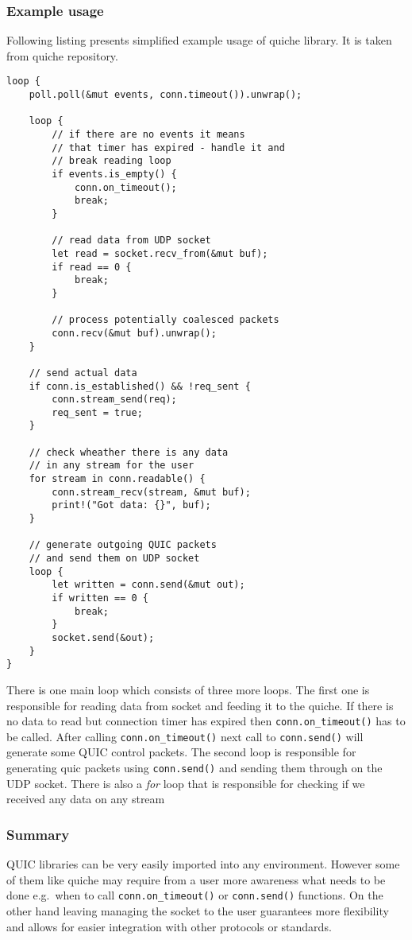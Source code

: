 \FloatBarrier

\subsubsection{Example usage}
Following listing presents simplified example usage of quiche library.
It is taken from quiche repository.
\begin{lstlisting}[label={lst:lstlisting2},caption={Simplified example usage of quiche library.},captionpos=b]
loop {
    poll.poll(&mut events, conn.timeout()).unwrap();

    loop {
        // if there are no events it means
        // that timer has expired - handle it and
        // break reading loop
        if events.is_empty() {
            conn.on_timeout();
            break;
        }

        // read data from UDP socket
        let read = socket.recv_from(&mut buf);
        if read == 0 {
            break;
        }

        // process potentially coalesced packets
        conn.recv(&mut buf).unwrap();
    }

    // send actual data
    if conn.is_established() && !req_sent {
        conn.stream_send(req);
        req_sent = true;
    }

    // check wheather there is any data
    // in any stream for the user
    for stream in conn.readable() {
        conn.stream_recv(stream, &mut buf);
        print!("Got data: {}", buf);
    }

    // generate outgoing QUIC packets
    // and send them on UDP socket
    loop {
        let written = conn.send(&mut out);
        if written == 0 {
            break;
        }
        socket.send(&out);
    }
}
\end{lstlisting}

There is one main loop which consists of three more loops.
The first one is responsible for reading data from socket and feeding it to the quiche.
If there is no data to read but connection timer has expired then \lstinline{conn.on_timeout()} has to be called.
After calling \lstinline{conn.on_timeout()} next call to \lstinline{conn.send()} will generate some QUIC control packets.
The second loop is responsible for generating quic packets using \lstinline{conn.send()} and sending them through on
the UDP socket.
There is also a \textit{for} loop that is responsible for checking if we received any data on any stream

\subsubsection{Summary}
QUIC libraries can be very easily imported into any environment.
However some of them like quiche may require from a user more awareness what needs to be done e.g.\
when to call \lstinline{conn.on_timeout()} or \lstinline{conn.send()} functions.
On the other hand leaving managing the socket to the user guarantees more flexibility and allows for easier integration with
other protocols or standards.


